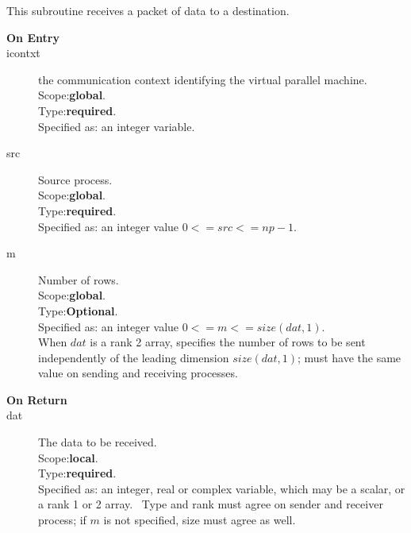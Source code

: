 This subroutine receives a packet of data to a destination.
\begin{description}
\item[\bf  On Entry ]
\item[icontxt] the communication context identifying the virtual
  parallel machine.\\
Scope:{\bf global}.\\
Type:{\bf required}.\\
Specified as: an integer variable.
\item[src] Source process.\\
Scope:{\bf global}.\\
Type:{\bf required}.\\
Specified as: an integer value $0<= src <= np-1$. \\
\item[m] Number of rows.\\
Scope:{\bf global}.\\
Type:{\bf Optional}.\\
Specified as: an integer value $0<= m <= size(dat,1)$. \\
When $dat$ is a rank 2 array, specifies the number of rows to be sent
independently of the leading dimension $size(dat,1)$; must have the
same value on sending and receiving processes.
\end{description}


\begin{description}
\item[\bf On Return]
\item[dat] The data to be received.\\
Scope:{\bf local}.\\
Type:{\bf required}.\\
Specified as: an integer, real or complex variable, which may be a
scalar, or a rank 1 or 2 array. \
Type and  rank must agree on sender and receiver process; if $m$ is
not specified, size must agree as well. 
\end{description}





